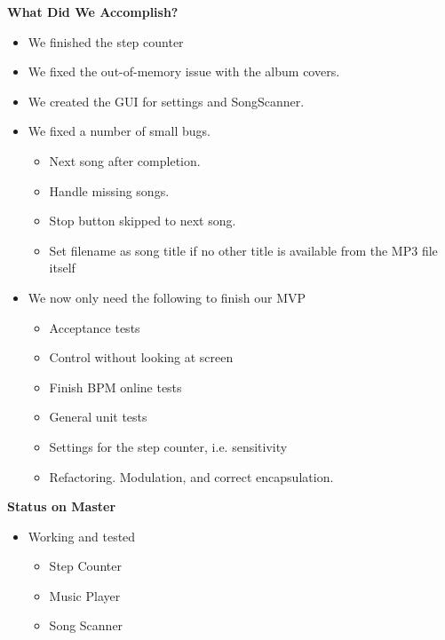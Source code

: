 \textbf{What Did We Accomplish?}
\begin{itemize}
\item We finished the step counter
\item We fixed the out-of-memory issue with the album covers.
\item We created the GUI for settings and SongScanner.
\item We fixed a number of small bugs.
\begin{itemize}
\item Next song after completion.
\item Handle missing songs.
\item Stop button skipped to next song.
\item Set filename as song title if no other title is available from the MP3 file itself 
\end{itemize}
\item We now only need the following to finish our MVP
\begin{itemize}
\item Acceptance tests
\item Control without looking at screen
\item Finish BPM online tests
\item General unit tests
\item Settings for the step counter, i.e. sensitivity
\item Refactoring. Modulation, and correct encapsulation.
\end{itemize}
\end{itemize}

\textbf{Status on Master}
\begin{itemize}
\item Working and tested
\begin{itemize}
\item Step Counter
\item Music Player
\item Song Scanner
\end{itemize}
\end{itemize}

